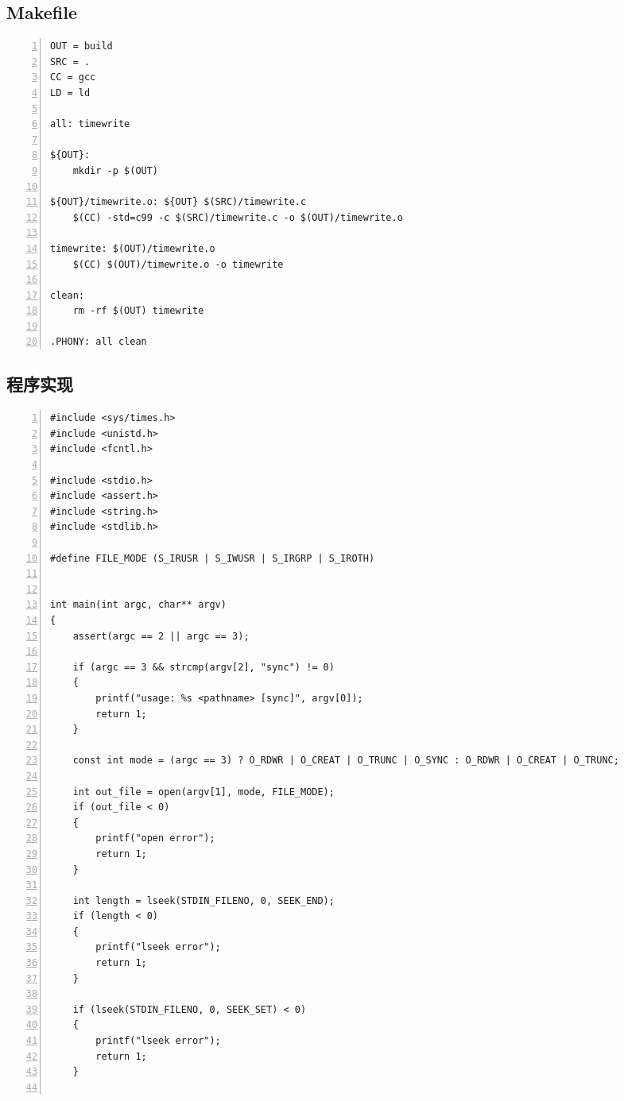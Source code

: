 \documentclass[a4paper,twoside]{article}
\begin{document}
\begin{spacing}{1.2}
\subsection{Makefile}


\begin{lstlisting}[numbers=left,style=MakefileStyle,caption=Makefile,label={code:makefile}]
OUT = build
SRC = .
CC = gcc
LD = ld

all: timewrite

${OUT}: 
	mkdir -p $(OUT)

${OUT}/timewrite.o: ${OUT} $(SRC)/timewrite.c
	$(CC) -std=c99 -c $(SRC)/timewrite.c -o $(OUT)/timewrite.o

timewrite: $(OUT)/timewrite.o
	$(CC) $(OUT)/timewrite.o -o timewrite

clean: 
	rm -rf $(OUT) timewrite

.PHONY: all clean	
\end{lstlisting}


\subsection{程序实现}

\begin{lstlisting}[numbers=left,style=CppStyle,caption=程序实现,label={code:impl}]
#include <sys/times.h>
#include <unistd.h>
#include <fcntl.h>

#include <stdio.h>
#include <assert.h>
#include <string.h>
#include <stdlib.h>

#define FILE_MODE (S_IRUSR | S_IWUSR | S_IRGRP | S_IROTH)


int main(int argc, char** argv)
{
    assert(argc == 2 || argc == 3);

    if (argc == 3 && strcmp(argv[2], "sync") != 0)
    {
        printf("usage: %s <pathname> [sync]", argv[0]);
        return 1;
    }

    const int mode = (argc == 3) ? O_RDWR | O_CREAT | O_TRUNC | O_SYNC : O_RDWR | O_CREAT | O_TRUNC;

    int out_file = open(argv[1], mode, FILE_MODE);
    if (out_file < 0)
    {
        printf("open error");
        return 1;
    }

    int length = lseek(STDIN_FILENO, 0, SEEK_END);
    if (length < 0)
    {
        printf("lseek error");
        return 1;
    }

    if (lseek(STDIN_FILENO, 0, SEEK_SET) < 0)
    {
        printf("lseek error");
        return 1;
    }


\end{lstlisting}
\end{spacing}
\end{document}
